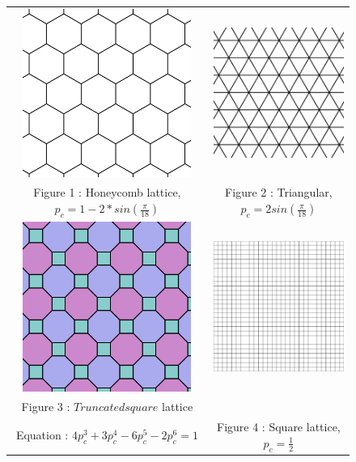 \documentclass{article}
\begin{document}
\begin{figure}
\begin{tabular}{cc}
  \includegraphics[width=55mm]{hexagonal_lattice} &   \includegraphics[width=55mm]{triangular_lattice} \\
Figure 1 : Honeycomb lattice, $p_c = 1 - 2 * sin(\frac{\pi}{18})$ & Figure 2 : Triangular, $p_c = 2sin(\frac{\pi}{18})$ \\[6pt]
 \includegraphics[width=
 55mm]{truncated_square_lattice} &   \includegraphics[width=55mm]{square_lattice} \\
Figure 3 : $Truncated square$ lattice\\ Equation : $4p_c^3 + 3p_c^4 - 6p_c^5 - 2p_c^6 = 1$ & Figure 4 : Square lattice, $p_c = \frac{1}{2}$\\[2pt]
\end{tabular}
\end{figure}
\end{document}
